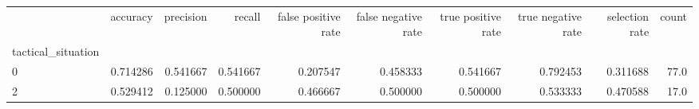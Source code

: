 \begin{tabular}{lrrrrrrrrr}
\toprule
{} &  accuracy &  precision &    recall &  false positive rate &  false negative rate &  true positive rate &  true negative rate &  selection rate &  count \\
tactical\_situation &           &            &           &                      &                      &                     &                     &                 &        \\
\midrule
0                  &  0.714286 &   0.541667 &  0.541667 &             0.207547 &             0.458333 &            0.541667 &            0.792453 &        0.311688 &   77.0 \\
2                  &  0.529412 &   0.125000 &  0.500000 &             0.466667 &             0.500000 &            0.500000 &            0.533333 &        0.470588 &   17.0 \\
\bottomrule
\end{tabular}
